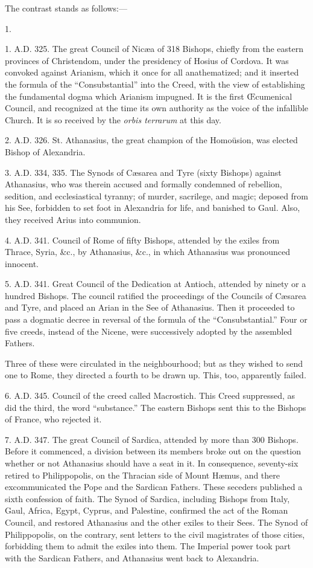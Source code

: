 The contrast stands as follows:—

1.

1. A.D. 325. The great Council of Nicæa of
318 Bishops, chiefly from the eastern provinces of Christendom, under
the presidency of Hosius of Cordova. It was convoked against Arianism,
which it once for all anathematized; and it inserted the formula of
the ``Consubstantial'' into the Creed, with the view of
establishing the fundamental dogma which Arianism impugned. It is the
first Œcumenical Council, and recognized at the time its own
authority as the voice of the infallible Church. It is so received by
the \emph{orbis terrarum} at this day.

2. A.D. 326. St. Athanasius, the great
champion of the Homoüsion, was elected Bishop of Alexandria.

3. A.D. 334, 335. The Synods of Cæsarea and
Tyre (sixty Bishops) against Athanasius, who was therein accused and
formally condemned of rebellion, sedition, and ecclesiastical tyranny;
of murder, sacrilege, and magic; deposed from his See, forbidden to
set foot in Alexandria for life, and banished to Gaul. Also, they
received Arius into communion.

4. A.D. 341. Council of Rome of fifty
Bishops, attended by the exiles from Thrace, Syria, \&c., by
Athanasius, \&c., in which Athanasius was pronounced innocent.

5. A.D. 341. Great Council of the Dedication
at Antioch, attended by ninety or a hundred Bishops. The council
ratified the proceedings of the Councils of Cæsarea and Tyre, and placed an Arian in the See of Athanasius. Then it proceeded to
pass a dogmatic decree in reversal of the formula of the
``Consubstantial.'' Four or five creeds, instead of the
Nicene, were successively adopted by the assembled Fathers.

Three of these were circulated in the neighbourhood; but as they
wished to send one to Rome, they directed a fourth to be drawn up.
This, too, apparently failed.

6. A.D. 345. Council of the creed called
Macrostich. This Creed suppressed, as did the third, the word
``substance.'' The eastern Bishops sent this to the Bishops of
France, who rejected it.

7. A.D. 347. The great Council of Sardica,
attended by more than 300 Bishops. Before it commenced, a division
between its members broke out on the question whether or not
Athanasius should have a seat in it. In consequence, seventy-six
retired to Philippopolis, on the Thracian side of Mount Hæmus, and
there excommunicated the Pope and the Sardican Fathers. These seceders
published a sixth confession of faith. The Synod of Sardica, including
Bishops from Italy, Gaul, Africa, Egypt, Cyprus, and Palestine,
confirmed the act of the Roman Council, and restored Athanasius and
the other exiles to their Sees. The Synod of Philippopolis, on the
contrary, sent letters to the civil magistrates of those cities,
forbidding them to admit the exiles into them. The Imperial power took
part with the Sardican Fathers, and Athanasius went back to
Alexandria.

